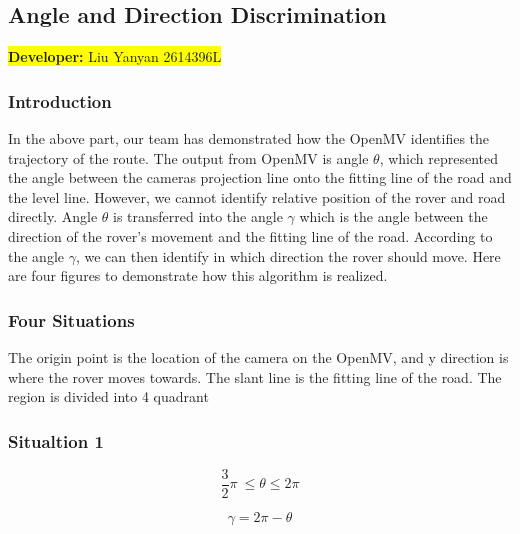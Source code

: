 \documentclass[12pt, a4paper, oneside]{report}
\begin{document}
\subsection{Angle and Direction Discrimination}\label{sec:add}
\colorbox{yellow}{\textbf{Developer:} Liu Yanyan 2614396L}

\subsubsection{Introduction}
In the above part, our team has demonstrated how the OpenMV identifies the trajectory of the route. The output from OpenMV is angle $\theta$, which represented the angle between the cameras projection line onto the fitting line of the road and the level line. However, we cannot identify relative position of the rover and road directly. Angle $\theta$ is transferred into the angle $\gamma$ which is the angle between the direction of the rover’s movement and the fitting line of the road. According to the angle $\gamma$, we can then identify in which direction the rover should move. Here are four figures to demonstrate how this algorithm is realized.

\subsubsection{Four Situations}
The origin point is the location of the camera on the OpenMV, and y direction is where the rover moves towards. The slant line is the fitting line of the road. The region is divided into 4 quadrant 

\subsubsection{Situaltion 1}

\begin{tcolorbox}
    $$\frac{3}{2} \pi\ \leq\theta\leq2\pi$$
    
    $$\gamma=2\pi-\theta$$
\end{tcolorbox}
\end{document}
